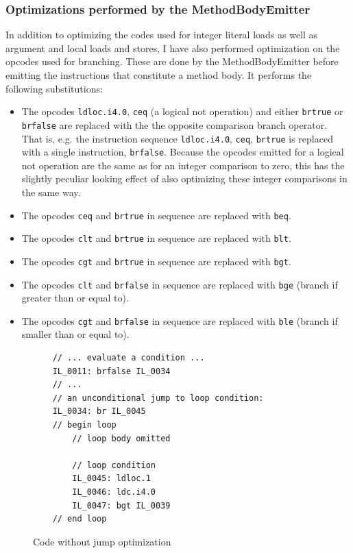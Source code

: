 \documentclass[a4paper,11pt]{article}
\begin{document}
\subsubsection{Optimizations performed by the MethodBodyEmitter}

In addition to optimizing the codes used for integer literal loads as well as argument and local loads and stores, I have also performed optimization on the opcodes used for branching. These are done by the MethodBodyEmitter before emitting the instructions that constitute a method body. It performs the following substitutions:
\begin{itemize}
    \item The opcodes \verb,ldloc.i4.0,, \verb,ceq, (a logical not operation) and either \verb,brtrue, or \verb,brfalse, are replaced with the the opposite comparison branch operator. That is, e.g. the instruction sequence \verb,ldloc.i4.0,, \verb,ceq,, \verb,brtrue, is replaced with a single instruction, \verb,brfalse,. Because the opcodes emitted for a logical not operation are the same as for an integer comparison to zero, this has the slightly peculiar looking effect of also optimizing these integer comparisons in the same way.
    \item The opcodes \verb,ceq, and \verb,brtrue, in sequence are replaced with \verb,beq,.
    \item The opcodes \verb,clt, and \verb,brtrue, in sequence are replaced with \verb,blt,.
    \item The opcodes \verb,cgt, and \verb,brtrue, in sequence are replaced with \verb,bgt,.
    \item The opcodes \verb,clt, and \verb,brfalse, in sequence are replaced with \verb,bge, (branch if greater than or equal to).
    \item The opcodes \verb,cgt, and \verb,brfalse, in sequence are replaced with \verb,ble, (branch if smaller than or equal to).
\end{itemize}

\begin{figure}[h!]
\caption{Code without jump optimization} \label{fig:code_unopt}
\begin{verbatim}
    // ... evaluate a condition ...
    IL_0011: brfalse IL_0034
    // ...
    // an unconditional jump to loop condition:
    IL_0034: br IL_0045
    // begin loop
        // loop body omitted

        // loop condition
        IL_0045: ldloc.1
        IL_0046: ldc.i4.0
        IL_0047: bgt IL_0039
    // end loop
\end{verbatim}
\end{figure}
\end{document}
